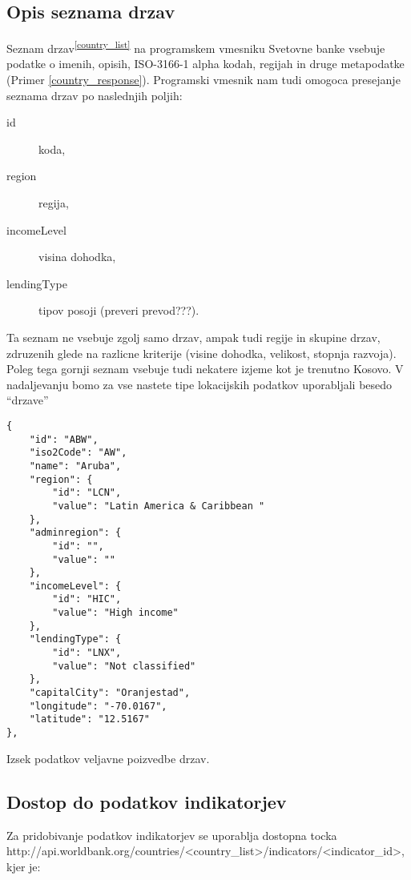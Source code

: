 \subsection{Opis seznama drzav}

Seznam drzav\textsuperscript{\ref{country_list}}  na programskem vmesniku 
Svetovne banke vsebuje podatke o imenih, opisih, ISO-3166-1 alpha kodah, 
regijah in druge metapodatke (Primer \ref{country_response}). Programski
vmesnik nam tudi omogoca presejanje seznama drzav po naslednjih poljih:
\begin{description}
\item [id] koda,
\item [region] regija,
\item [incomeLevel] visina dohodka,
\item [lendingType] tipov posoji (preveri prevod???).
\end{description}

Ta seznam ne vsebuje zgolj samo drzav, ampak tudi regije in skupine drzav, 
zdruzenih glede na razlicne kriterije (visine dohodka, velikost, stopnja
razvoja). Poleg tega gornji seznam vsebuje tudi nekatere izjeme kot je trenutno
Kosovo. V nadaljevanju bomo za vse nastete tipe lokacijskih podatkov
uporabljali besedo ``drzave''

\begin{snippet}
\begin{center}
\begin{lstlisting}
{
    "id": "ABW",
    "iso2Code": "AW",
    "name": "Aruba",
    "region": {
        "id": "LCN",
        "value": "Latin America & Caribbean "
    },
    "adminregion": {
        "id": "",
        "value": ""
    },
    "incomeLevel": {
        "id": "HIC",
        "value": "High income"
    },
    "lendingType": {
        "id": "LNX",
        "value": "Not classified"
    },
    "capitalCity": "Oranjestad",
    "longitude": "-70.0167",
    "latitude": "12.5167"
},
\end{lstlisting}
\end{center}
\caption[some]{Izsek podatkov veljavne poizvedbe drzav.}
\label{country_response}
\end{snippet} 


\subsection{Dostop do podatkov indikatorjev}


Za pridobivanje podatkov indikatorjev se uporablja dostopna tocka
http://api.worldbank.org/countries/<country\_list>/indicators/<indicator\_id>,
kjer je:


